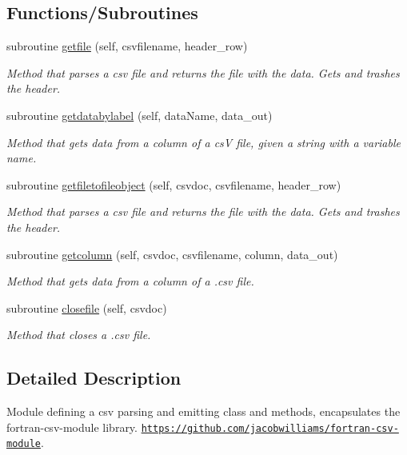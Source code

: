\subsection*{Functions/\+Subroutines}
\begin{DoxyCompactItemize}
\item 
subroutine \mbox{\hyperlink{namespacecsvparser__mod_abb79b5f7cda09a8a89eb9c5cb3fb126c}{getfile}} (self, csvfilename, header\+\_\+row)
\begin{DoxyCompactList}\small\item\em Method that parses a csv file and returns the file with the data. Gets and trashes the header. \end{DoxyCompactList}\item 
subroutine \mbox{\hyperlink{namespacecsvparser__mod_aa7dbe42af8b97daccf58fc7be9939f60}{getdatabylabel}} (self, data\+Name, data\+\_\+out)
\begin{DoxyCompactList}\small\item\em Method that gets data from a column of a csV file, given a string with a variable name. \end{DoxyCompactList}\item 
subroutine \mbox{\hyperlink{namespacecsvparser__mod_a29e2d40db736b6ff9fb100ef316e0ebe}{getfiletofileobject}} (self, csvdoc, csvfilename, header\+\_\+row)
\begin{DoxyCompactList}\small\item\em Method that parses a csv file and returns the file with the data. Gets and trashes the header. \end{DoxyCompactList}\item 
subroutine \mbox{\hyperlink{namespacecsvparser__mod_ae966faafebb8c4035e12e0bb24de717c}{getcolumn}} (self, csvdoc, csvfilename, column, data\+\_\+out)
\begin{DoxyCompactList}\small\item\em Method that gets data from a column of a .csv file. \end{DoxyCompactList}\item 
subroutine \mbox{\hyperlink{namespacecsvparser__mod_a8f56a69c948d139a3e9c88476f25305d}{closefile}} (self, csvdoc)
\begin{DoxyCompactList}\small\item\em Method that closes a .csv file. \end{DoxyCompactList}\end{DoxyCompactItemize}


\subsection{Detailed Description}
Module defining a csv parsing and emitting class and methods, encapsulates the fortran-\/csv-\/module library. \href{https://github.com/jacobwilliams/fortran-csv-module}{\tt https\+://github.\+com/jacobwilliams/fortran-\/csv-\/module}. 

